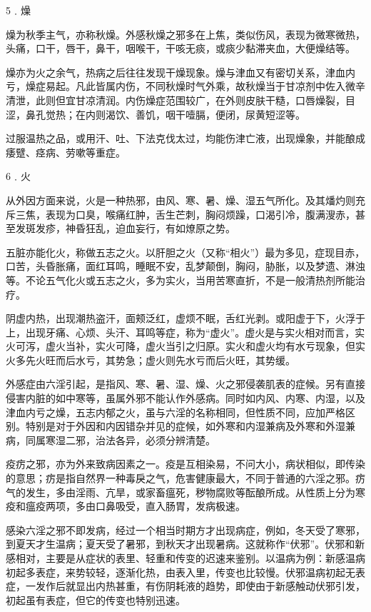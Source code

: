 \documentclass[a4paper,12pt,UTF8,twoside]{ctexbook}
\begin{document}
5﹒燥

燥为秋季主气，亦称秋燥。外感秋燥之邪多在上焦，类似伤风，表现为微寒微热，头痛，口干，唇干，鼻干，咽喉干，干咳无痰，或痰少黏滞夹血，大便燥结等。

燥亦为火之余气，热病之后往往发现干燥现象。燥与津血又有密切关系，津血内亏，燥症易起。凡此皆属内伤，不同秋燥时气外乘，故秋燥当于甘凉剂中佐入微辛清泄，此则但宜甘凉清润。内伤燥症范围较广，在外则皮肤干糙，口唇燥裂，目涩，鼻孔觉热；在内则渴饮、善饥，咽干噎膈，便闭，尿黄短涩等。

过服温热之品，或用汗、吐、下法克伐太过，均能伤津亡液，出现燥象，并能酿成痿躄、痉病、劳嗽等重症。

6﹒火

从外因方面来说，火是一种热邪，由风、寒、暑、燥、湿五气所化。及其燔灼则充斥三焦，表现为口臭，喉痛红肿，舌生芒刺，胸闷烦躁，口渴引冷，腹满溲赤，甚至发斑发疹，神昏狂乱，迫血妄行，有如燎原之势。

五脏亦能化火，称做五志之火。以肝胆之火（又称“相火”）最为多见，症现目赤，口苦，头昏胀痛，面红耳鸣，睡眠不安，乱梦颠倒，胸闷，胁胀，以及梦遗、淋浊等。不论五气化火或五志之火，多为实火，当用苦寒直折，不是一般清热剂所能治疗。

阴虚内热，出现潮热盗汗，面颊泛红，虚烦不眠，舌红光剥。或阳虚于下，火浮于上，出现牙痛、心烦、头汗、耳鸣等症，称为“虚火”。虚火是与实火相对而言，实火可泻，虚火当补，实火可降，虚火当引之归原。实火和虚火均有水亏现象，但实火多先火旺而后水亏，其势急；虚火则先水亏而后火旺，其势缓。

外感症由六淫引起，是指风、寒、暑、湿、燥、火之邪侵袭肌表的症候。另有直接侵害内脏的如中寒等，虽属外邪不能认作外感病。同时如内风、内寒、内湿，以及津血内亏之燥，五志内郁之火，虽与六淫的名称相同，但性质不同，应加严格区别。特别是对于外因和内因错杂并见的症候，如外寒和内湿兼病及外寒和外湿兼病，同属寒湿二邪，治法各异，必须分辨清楚。

疫疠之邪，亦为外来致病因素之一。疫是互相染易，不问大小，病状相似，即传染的意思；疠是指自然界一种毒戾之气，危害健康最大，不同于普通的六淫之邪。疠气的发生，多由淫雨、亢旱，或家畜瘟死，秽物腐败等酝酿所成。从性质上分为寒疫和瘟疫两项，多由口鼻吸受，直入肠胃，发病极速。

感染六淫之邪不即发病，经过一个相当时期方才出现病症，例如，冬天受了寒邪，到夏天才生温病；夏天受了暑邪，到秋天才出现暑病。这就称作“伏邪”。伏邪和新感相对，主要是从症状的表里、轻重和传变的迟速来鉴别。以温病为例：新感温病初起多表症，来势较轻，逐渐化热，由表入里，传变也比较慢。伏邪温病初起无表症，一发作后就显出内热甚重，有伤阴耗液的趋势，即使由于新感触动伏邪引发，初起虽有表症，但它的传变也特别迅速。
\end{document}
